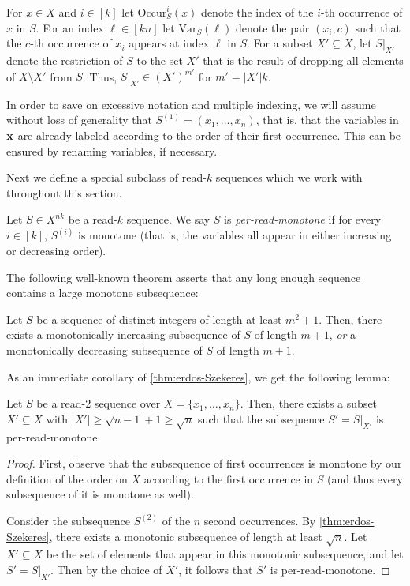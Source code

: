 \documentclass[11pt]{article}
\newcommand{\occur}[3]{\mathrm{Occur}_{#1}^{#2}({#3})}
\newcommand{\var}[2]{\mathrm{Var}_{#1}({#2})}
\begin{document}
For $x \in X$ and $i \in [k]$ let $\occur{S}{i}{x}$ denote the index of the $i$-th occurrence of $x$ in $S$.  For an index $\ell \in [kn]$ let $\var{S}{\ell}$ denote the pair $(x_i,c)$ such that the $c$-th occurrence of $x_i$ appears at index $\ell$ in $S$.   For a subset $X' \subseteq X$, let $S|_{X'}$ denote the restriction of $S$ to the set $X'$ that is the result of dropping all elements of $X \setminus X'$ from $S$. Thus, $S|_{X'} \in (X')^{m'}$ for $m'=|X'|k$.

In order to save on excessive notation and multiple indexing, we will assume without loss of generality that $S^{(1)} = (x_1, \ldots, x_n)$, that is, that the variables in $\mathbf{x}$ are already labeled according to the order of their first occurrence. This can be ensured by renaming variables, if necessary. 

Next we define a special subclass of read-$k$ sequences which we work with throughout this section.

\begin{definition}
Let $S \in X^{nk}$ be a read-$k$ sequence. We say $S$ is {\em per-read-monotone} if for every $i \in [k]$, $S^{(i)}$ is monotone (that is, the variables all appear in either increasing or decreasing order).
\end{definition}


The following well-known theorem asserts that any long enough sequence contains a large monotone subsequence:

\begin{theorem}
\label{thm:erdos-Szekeres}
Let $S$ be a sequence of distinct integers of length at least $m^2+1$. Then, there exists a monotonically increasing subsequence of $S$ of length $m+1$, \emph{or} a monotonically decreasing subsequence of $S$ of length $m+1$.
\end{theorem}

As an immediate corollary of \autoref{thm:erdos-Szekeres}, we get the following lemma:
\begin{lemma}
\label{lem:2-per-read-mon}
Let $S$ be a read-$2$ sequence over $X=\{x_1, \ldots, x_n\}$. Then, there exists a subset $X' \subseteq X$ with $|X'| \ge \sqrt{n-1} +1 \ge \sqrt{n}$ such that the subsequence $S'=S|_{X'}$ is per-read-monotone.
\end{lemma}

\begin{proof}
First, observe that the subsequence of first occurrences is monotone by our definition of the order on $X$ according to the first occurrence in $S$ (and thus every subsequence of it is monotone as well).

Consider the subsequence $S^{(2)}$ of the $n$ second occurrences. By \autoref{thm:erdos-Szekeres}, there exists a monotonic subsequence of length at least $\sqrt{n}$. Let $X' \subseteq X$ be the set of elements that appear in this monotonic subsequence, and let $S'=S|_{X'}$. Then by the choice of $X'$, it follows that $S'$ is per-read-monotone.
\end{proof}
\end{document}
